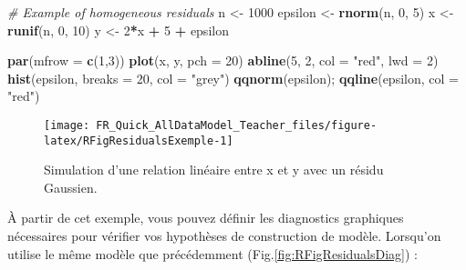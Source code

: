 \documentclass[french,a4paper]{article}
\newenvironment{Shaded}{\begin{snugshade}}{\end{snugshade}}
\newcommand{\KeywordTok}[1]{\textcolor[rgb]{0.13,0.29,0.53}{\textbf{#1}}}
\newcommand{\DataTypeTok}[1]{\textcolor[rgb]{0.13,0.29,0.53}{#1}}
\newcommand{\DecValTok}[1]{\textcolor[rgb]{0.00,0.00,0.81}{#1}}
\newcommand{\StringTok}[1]{\textcolor[rgb]{0.31,0.60,0.02}{#1}}
\newcommand{\CommentTok}[1]{\textcolor[rgb]{0.56,0.35,0.01}{\textit{#1}}}
\newcommand{\OperatorTok}[1]{\textcolor[rgb]{0.81,0.36,0.00}{\textbf{#1}}}
\newcommand{\NormalTok}[1]{#1}
\begin{document}
\begin{Shaded}
\begin{Highlighting}[]
\CommentTok{# Example of homogeneous residuals}
\NormalTok{n <-}\StringTok{ }\DecValTok{1000}
\NormalTok{epsilon <-}\StringTok{ }\KeywordTok{rnorm}\NormalTok{(n, }\DecValTok{0}\NormalTok{, }\DecValTok{5}\NormalTok{)}
\NormalTok{x <-}\StringTok{ }\KeywordTok{runif}\NormalTok{(n, }\DecValTok{0}\NormalTok{, }\DecValTok{10}\NormalTok{)}
\NormalTok{y <-}\StringTok{ }\DecValTok{2}\OperatorTok{*}\NormalTok{x }\OperatorTok{+}\StringTok{ }\DecValTok{5} \OperatorTok{+}\StringTok{ }\NormalTok{epsilon}

\KeywordTok{par}\NormalTok{(}\DataTypeTok{mfrow =} \KeywordTok{c}\NormalTok{(}\DecValTok{1}\NormalTok{,}\DecValTok{3}\NormalTok{))}
\KeywordTok{plot}\NormalTok{(x, y, }\DataTypeTok{pch =} \DecValTok{20}\NormalTok{)}
\KeywordTok{abline}\NormalTok{(}\DecValTok{5}\NormalTok{, }\DecValTok{2}\NormalTok{, }\DataTypeTok{col =} \StringTok{"red"}\NormalTok{, }\DataTypeTok{lwd =} \DecValTok{2}\NormalTok{)}
\KeywordTok{hist}\NormalTok{(epsilon, }\DataTypeTok{breaks =} \DecValTok{20}\NormalTok{, }\DataTypeTok{col =} \StringTok{"grey"}\NormalTok{)}
\KeywordTok{qqnorm}\NormalTok{(epsilon); }\KeywordTok{qqline}\NormalTok{(epsilon, }\DataTypeTok{col =} \StringTok{"red"}\NormalTok{)}
\end{Highlighting}
\end{Shaded}

\begin{figure}[!h]

{\centering \texttt{[image: FR\_Quick\_AllDataModel\_Teacher\_files/figure-latex/RFigResidualsExemple-1]} 

}

\caption{Simulation d'une relation linéaire entre x
et y avec un résidu Gaussien.}\label{fig:RFigResidualsExemple}
\end{figure}

À partir de cet exemple, vous pouvez définir les diagnostics graphiques
nécessaires pour vérifier vos hypothèses de construction de modèle.
Lorsqu'on utilise le même modèle que précédemment
(Fig.\ref{fig:RFigResidualsDiag}) :
\end{document}

